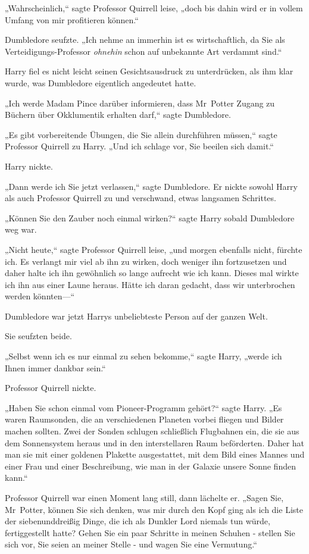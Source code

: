 {„Wahrscheinlich,“ sagte Professor Quirrell leise, „doch bis dahin wird er in vollem Umfang von mir profitieren können.“

Dumbledore seufzte. „Ich nehme an immerhin ist es wirtschaftlich, da Sie als Verteidigungs-Professor \emph{ohnehin} schon auf unbekannte Art verdammt sind.“

Harry fiel es nicht leicht seinen Gesichtsausdruck zu unterdrücken, als ihm klar wurde, was Dumbledore eigentlich angedeutet hatte.

„Ich werde Madam Pince darüber informieren, dass Mr~Potter Zugang zu Büchern über Okklumentik erhalten darf,“ sagte Dumbledore.

„Es gibt vorbereitende Übungen, die Sie allein durchführen müssen,“ sagte Professor Quirrell zu Harry. „Und ich schlage vor, Sie beeilen sich damit.“

Harry nickte.

„Dann werde ich Sie jetzt verlassen,“ sagte Dumbledore. Er nickte sowohl Harry als auch Professor Quirrell zu und verschwand, etwas langsamen Schrittes.

„Können Sie den Zauber noch einmal wirken?“ sagte Harry sobald Dumbledore weg war.

„Nicht heute,“ sagte Professor Quirrell leise, „und morgen ebenfalls nicht, fürchte ich. Es verlangt mir viel ab ihn zu wirken, doch weniger ihn fortzusetzen und daher halte ich ihn gewöhnlich so lange aufrecht wie ich kann. Dieses mal wirkte ich ihn aus einer Laune heraus. Hätte ich daran gedacht, dass wir unterbrochen werden könnten—“

Dumbledore war jetzt Harrys unbeliebteste Person auf der ganzen Welt.

Sie seufzten beide.

„Selbst wenn ich es nur einmal zu sehen bekomme,“ sagte Harry, „werde ich Ihnen immer dankbar sein.“

Professor Quirrell nickte.

„Haben Sie schon einmal vom Pioneer-Programm gehört?“ sagte Harry. „Es waren Raumsonden, die an verschiedenen Planeten vorbei fliegen und Bilder machen sollten. Zwei der Sonden schlugen schließlich Flugbahnen ein, die sie aus dem Sonnensystem heraus und in den interstellaren Raum beförderten. Daher hat man sie mit einer goldenen Plakette ausgestattet, mit dem Bild eines Mannes und einer Frau und einer Beschreibung, wie man in der Galaxie unsere Sonne finden kann.“

Professor Quirrell war einen Moment lang still, dann lächelte er. „Sagen Sie, Mr~Potter, können Sie sich denken, was mir durch den Kopf ging als ich die Liste der siebenunddreißig Dinge, die ich als Dunkler Lord niemals tun würde, fertiggestellt hatte? Gehen Sie ein paar Schritte in meinen Schuhen - stellen Sie sich vor, Sie seien an meiner Stelle - und wagen Sie eine Vermutung.“

}
